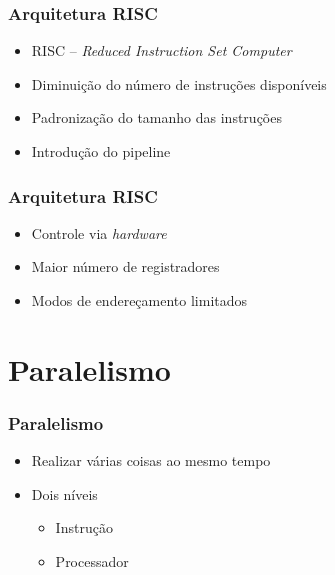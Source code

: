 \documentclass[aspectratio=169,
				xcolor=table]{beamer}
\begin{document}
	\begin{frame}
		\frametitle{Arquitetura RISC}
		\begin{itemize}
			\item RISC – \textit{Reduced Instruction Set Computer}
			\vspace{1em}

			\item Diminuição do número de instruções disponíveis
			\vspace{1em}
			
			\item Padronização do tamanho das instruções
			\vspace{1em}

			\item Introdução do pipeline
		\end{itemize}
	\end{frame}
	
	\begin{frame}
		\frametitle{Arquitetura RISC}
		\begin{itemize}
			\item Controle via \textit{hardware}
			\vspace{1em}
			\item Maior número de registradores
			\vspace{1em}
			\item Modos de endereçamento limitados
		\end{itemize}
	\end{frame}
	
	\section{Paralelismo}	
	
	\begin{frame}
		\frametitle{Paralelismo}
		\begin{itemize}
			\item Realizar várias coisas ao mesmo tempo
			\vspace{1em}	
			\item Dois níveis
			\begin{itemize}
				\item Instrução
				\item Processador
			\end{itemize}

		\end{itemize}
	\end{frame}
	
\end{document}
